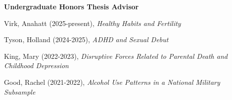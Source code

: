 \begin{comment}
\item Lacey, Conor (Oct 2022), \textit{Effect Sizes for Measurement Non-Invariance: A Review}.  Wake Forest%
\item Hwang, Yoo Ri$\dagger$ (Oct 2021), \textit{The SES-health Gradient: Comparing Two Approaches}. Wake Forest%
\item Yi, Ye Dam (Oct 2020), \textit{Feeling for Another: The Role of Emotions on Self-Other Differences in Risk-Involving Decisions}. Wake Forest%
\item Slipetz, Lindley (Sep 2020), \textit{The Structure of Depression Symptomatology: A Comparison of Factor and Network Analyses}. Wake Forest%
\item Demaske, Alana (Oct 2019), \textit{Examining the construct validity and functional utility of personal growth initiative in a war-affected Sri Lankan sample}. Wake Forest%
\end{etaremune}%
\end{comment}
{\large\textbf{Undergraduate Honors Thesis Advisor}}
\begin{etaremune}%
\item Virk, Anahatt (2025-present), \textit{Healthy Habits and Fertility}
\item Tyson, Holland (2024-2025), \textit{ADHD and Sexual Debut}
\item King, Mary (2022-2023), \textit{Disruptive Forces Related to Parental Death and Childhood Depression} %
\item Good, Rachel (2021-2022), \textit{Alcohol Use Patterns in a National Military Subsample} %
\end{etaremune}%

